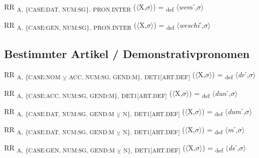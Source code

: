 {\begin{exe}
 RR \textsubscript{A,} \textsubscript{\{CASE:DAT, NUM:SG\},} \textsubscript{PRON.INTER} ($\langle$X,$\sigma $$\rangle$) = \textsubscript{def} $\langle$\textit{wem}ˊ,$\sigma $$\rangle$
\end{exe}

\begin{exe}
 RR \textsubscript{A,} \textsubscript{\{CASE:GEN, NUM:SG\},} \textsubscript{PRON.INTER} ($\langle$X,$\sigma $$\rangle$) = \textsubscript{def} $\langle$\textit{weschi}ˊ,$\sigma $$\rangle$
\end{exe}

\subsection{Bestimmter Artikel / Demonstrativpronomen}

\begin{exe}
 RR \textsubscript{A,} \textsubscript{\{CASE:NOM} \textsubscript{${\veebar}$}\textsubscript{ ACC, NUM:SG, GEND:M\},} \textsubscript{DET1[ART.DEF]} ($\langle$X,$\sigma $$\rangle$) = \textsubscript{def} $\langle$\textit{dr}ˊ,$\sigma $$\rangle$
\end{exe}

\begin{exe}
 RR \textsubscript{A,} \textsubscript{\{CASE:ACC, NUM:SG, GEND:M\},} \textsubscript{DET1[ART.DEF]} ($\langle$X,$\sigma $$\rangle$) = \textsubscript{def} $\langle$\textit{dun}ˊ,$\sigma $$\rangle$
\end{exe}

\begin{exe}
 RR \textsubscript{A,} \textsubscript{\{CASE:DAT, NUM:SG, GEND:M} \textsubscript{${\veebar}$}\textsubscript{ N\},} \textsubscript{DET1[ART.DEF]} ($\langle$X,$\sigma $$\rangle$) = \textsubscript{def} $\langle$\textit{dum}ˊ,$\sigma $$\rangle$
\end{exe}

\begin{exe}
 RR \textsubscript{A,} \textsubscript{\{CASE:DAT, NUM:SG, GEND:M} \textsubscript{${\veebar}$}\textsubscript{ N\},} \textsubscript{DET1[ART.DEF]} ($\langle$X,$\sigma $$\rangle$) = \textsubscript{def} $\langle$\textit{m}ˊ,$\sigma $$\rangle$
\end{exe}

\begin{exe}
 RR \textsubscript{A,} \textsubscript{\{CASE:GEN, NUM:SG, GEND:M} \textsubscript{${\veebar}$}\textsubscript{ N\},} \textsubscript{DET1[ART.DEF]} ($\langle$X,$\sigma $$\rangle$) = \textsubscript{def} $\langle$\textit{ds}ˊ,$\sigma $$\rangle$
\end{exe}

}
